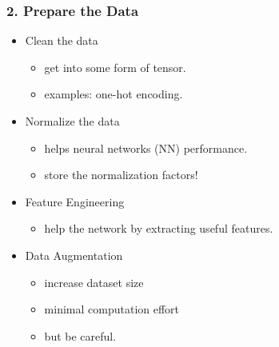 \documentclass{beamer}
\begin{document}
\begin{frame}

    \frametitle{2. Prepare the Data}

    \begin{itemize}
        \item Clean the data
        \begin{itemize}
            \item get into some form of tensor.
            \item examples: one-hot encoding.
        \end{itemize}
        \item Normalize the data
        \begin{itemize}
            \item helps neural networks (NN) performance.
            \item store the normalization factors!
        \end{itemize}
        \item Feature Engineering
        \begin{itemize}
            \item help the network by extracting useful features.
        \end{itemize}
        \item Data Augmentation
        \begin{itemize}
            \item increase dataset size
            \item minimal computation effort
            \item but be careful.
        \end{itemize}
    \end{itemize}
\end{frame}
\end{document}
